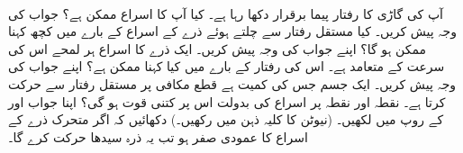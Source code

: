 \\
آپ کی گاڑی کا  رفتار پیما  برقرار  دکھا رہا ہے۔ کیا آپ کا اسراع ممکن ہے؟ جواب کی وجہ پیش کریں۔
کیا مستقل رفتار سے  چلتے ہوئے ذرے  کے اسراع کے بارے میں کچھ کہنا ممکن ہو گا؟ اپنے جواب کی وجہ پیش کریں۔ 
ایک ذرے  کا اسراع ہر لمحے اس کی  سرعت کے متعامد ہے۔ اس کی رفتار کے بارے میں کیا کہنا ممکن ہے؟ اپنے جواب کی وجہ پیش کریں۔
ایک جسم جس کی کمیت  ہے قطع مکافی  پر مستقل رفتار  سے حرکت کرتا ہے۔ نقطہ  اور نقطہ   پر اسراع کی بدولت اس پر کتنی قوت ہو گی؟  اپنا جواب  اور  کے روپ میں لکھیں۔ (نیوٹن کا کلیہ  ذہن میں رکھیں۔)
دکھائیں کہ  اگر  متحرک  ذرے کے   اسراع کا عمودی  صفر ہو  تب یہ   ذرہ سیدھا  حرکت کرے  گا۔

